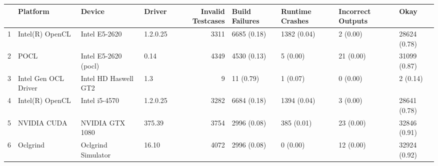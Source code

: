 \begin{tabular}{llllrllll}
\toprule
{} &              Platform &                Device &    Driver &  Invalid Testcases & Build Failures & Runtime Crashes & Incorrect Outputs &          Okay \\
\midrule
1 &       Intel(R) OpenCL &         Intel E5-2620 &  1.2.0.25 &               3311 &    6685 (0.18) &     1382 (0.04) &          2 (0.00) &  28624 (0.78) \\
2 &                  POCL &  Intel E5-2620 (pocl) &      0.14 &               4349 &    4530 (0.13) &        5 (0.00) &         21 (0.00) &  31099 (0.87) \\
3 &  Intel Gen OCL Driver &  Intel HD Haswell GT2 &       1.3 &                  9 &      11 (0.79) &        1 (0.07) &          0 (0.00) &      2 (0.14) \\
4 &       Intel(R) OpenCL &         Intel i5-4570 &  1.2.0.25 &               3282 &    6684 (0.18) &     1394 (0.04) &          3 (0.00) &  28641 (0.78) \\
5 &           NVIDIA CUDA &       NVIDIA GTX 1080 &    375.39 &               3754 &    2996 (0.08) &      385 (0.01) &         23 (0.00) &  32846 (0.91) \\
6 &              Oclgrind &    Oclgrind Simulator &     16.10 &               4072 &    2996 (0.08) &        0 (0.00) &         12 (0.00) &  32924 (0.92) \\
\bottomrule
\end{tabular}
